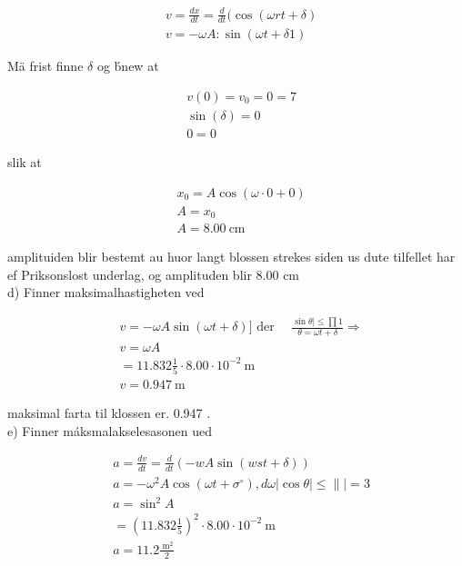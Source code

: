\documentclass[10pt]{article}
\begin{document}
$$
\begin{aligned}
& v=\frac{d x}{d t}=\frac{d}{d t}(\cos (\omega r t+\delta) \\
& v=-\omega A: \sin (\omega t+\delta 1)
\end{aligned}
$$

Mä frist finne $\delta$ og b́new at

$$
\begin{aligned}
& v(0)=v_{0}=0=7 \\
& \sin (\delta)=0 \\
& 0=0
\end{aligned}
$$

slik at

$$
\begin{aligned}
& x_{0}=A \cos (\omega \cdot 0+0) \\
& A=x_{0} \\
& A=8.00 \mathrm{~cm}
\end{aligned}
$$

amplituiden blir bestemt au huor langt blossen strekes siden us dute tilfellet har ef Priksonslost underlag, og amplituden blir 8.00 cm\\
d) Finner maksimalhastigheten ved

$$
\begin{aligned}
& v=-\omega A \sin (\omega t+\delta)] \text { der } \quad \frac{\sin \theta \mid \leq \prod 1}{\theta=\omega t+\delta} \Rightarrow \\
& v=\omega A \\
& =11.832 \frac{1}{5} \cdot 8.00 \cdot 10^{-2} \mathrm{~m} \\
& v=0.947 \mathrm{~m}
\end{aligned}
$$

maksimal farta til klossen er. 0.947 .\\
e) Finner máksmalakselesasonen ued

$$
\begin{aligned}
& a=\frac{d v}{d t}=\frac{d}{d t}(-w A \sin (w s t+\delta)) \\
& a=-\omega^{2} A \cos \left(\omega t+\sigma^{\circ}\right), d \omega|\cos \theta| \leq \| \mid=3 \\
& a=\sin ^{2} A \\
& =\left(11.832 \frac{1}{5}\right)^{2} \cdot 8.00 \cdot 10^{-2} \mathrm{~m} \\
& a=11.2 \frac{\mathrm{~m}^{2}}{2}
\end{aligned}
$$
\end{document}
